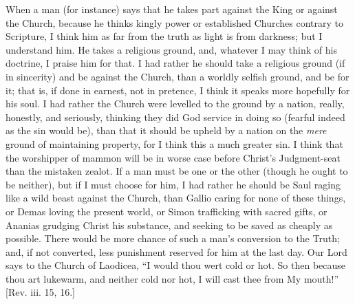 When a man (for instance) says that he takes part against the King
or against the Church, because he thinks kingly power or established
Churches contrary to Scripture, I think him as far from the truth as
light is from darkness; but I understand him. He takes a religious
ground, and, whatever I may think of his doctrine, I praise him for
that. I had rather he should take a religious ground (if in sincerity)
and be against the Church, than a worldly selfish ground, and be for
it; that is, if done in earnest, not in pretence, I think it speaks
more hopefully for his soul. I had rather the Church were levelled to
the ground by a nation, really, honestly, and seriously, thinking they
did God service in doing so (fearful indeed as the sin would be), than
that it should be upheld by a nation on the \emph{mere} ground of
maintaining property, for I think this a much greater sin. I think
that the worshipper of mammon will be in worse case before Christ's
Judgment-seat than the mistaken zealot. If a man must be one or the
other (though he ought to be neither), but if I must choose for him, I
had rather he should be Saul raging like a wild beast against the
Church, than Gallio caring for none of these things, or Demas loving
the present world, or Simon trafficking with sacred gifts, or Ananias
grudging Christ his substance, and seeking to be saved as cheaply as
possible. There would be more chance of such a man's conversion to
the Truth; and, if not converted, less punishment reserved for him at
the last day. Our Lord says to the Church of Laodicea, ``I would
thou wert cold or hot. So then because thou art lukewarm, and neither
cold nor hot, I will cast thee from My mouth!'' [Rev. iii. 15,
16.]


